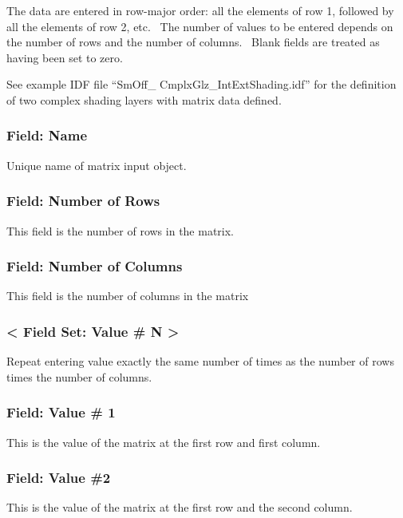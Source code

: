 The data are entered in row-major order: all the elements of row 1, followed by all the elements of row 2, etc.~ The number of values to be entered depends on the number of rows and the number of columns.~ Blank fields are treated as having been set to zero.

See example IDF file ``SmOff\_ CmplxGlz\_IntExtShading.idf'' for the definition of two complex shading layers with matrix data defined.

\subsubsection{Field: Name}\label{field-name-34-000}

Unique name of matrix input object.

\subsubsection{Field: Number of Rows}\label{field-number-of-rows}

This field is the number of rows in the matrix.

\subsubsection{Field: Number of Columns}\label{field-number-of-columns}

This field is the number of columns in the matrix

\subsubsection{\textless{} Field Set: Value \# N \textgreater{}}\label{field-set-value-n}

Repeat entering value exactly the same number of times as the number of rows times the number of columns.

\subsubsection{Field: Value \# 1}\label{field-value-1-000}

This is the value of the matrix at the first row and first column.

\subsubsection{Field: Value \#2}\label{field-value-2}

This is the value of the matrix at the first row and the second column.

